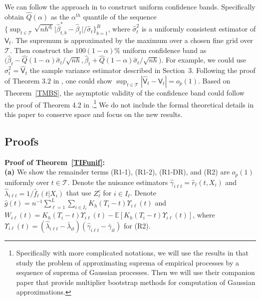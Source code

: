 \documentclass[lettersize, 12pt]{article}
\begin{document}
{We can follow the approach in \cite{Fan} to construct uniform confidence bands.
Specifically obtain $\hat Q(\alpha)$ as the $\alpha^{th}$ quantile of the sequence $\big\{\sup_{t\in\mathcal{T}} \sqrt{nh^{d_t}} \big|\hat\beta^\ast_{t,b} - \hat \beta_t\big|/\hat\sigma_t\big\}_{b=1}^B$, where $\hat\sigma_t^2$ is a uniformly consistent estimator of $\mathsf{V}_t$.
The supremum is approximated by the maximum over a chosen fine grid over $\mathcal{T}$.  
Then construct the $100(1-\alpha)\%$  uniform confidence band as $\big(\hat\beta_t - \hat Q(1-\alpha) \hat\sigma_t/\sqrt{nh}, \hat\beta_t + \hat Q(1-\alpha) \hat\sigma_t/\sqrt{nh} \big)$.
For example, we could use $\hat\sigma_t^2 = \hat{\mathsf{V}}_t$ the sample variance estimator described in Section~3.
Following the proof of Theorem 3.2 in \cite{Fan}, one could show 
$\sup_{t\in\mathcal{T} } |\hat{\mathsf{V}}_t - \mathsf{V}_t| = o_p(1)$.
Based on Theorem~\ref{TMBS}, the asymptotic validity of the confidence band could follow the proof of Theorem 4.2 in \cite{Fan}.\footnote{Specifically with more complicated notations,  
we will use the results in \cite{CCK14b} that study the problem of approximating suprema of empirical processes by a sequence of suprema of Gaussian processes.
Then we will use their companion paper \cite{CCK14a} that provide multiplier bootstrap methods for computation of Gaussian approximations.} 
We do not include the formal theoretical details in this paper to conserve space and focus on the new results.
 


\subsection{Proofs}
\label{Apf}
\textbf{Proof of Theorem~\ref{TIFunif}:}\\[5pt]
\textbf{(a)}
We show the remainder terms (R1-1), (R1-2), (R1-DR), and (R2) are $o_p(1)$ uniformly over $t\in \mathcal{T}$.
Denote the nuisance estimators $\hat \gamma_{i\ell t} = \hat r_\ell(t, X_i)$ and $\hat \lambda_{i\ell t} = 1/\hat f_{\ell}(t|X_i)$ that use $Z_\ell^c$ for $i \in I_\ell$.
Denote $\hat g(t) = n^{-1}\sum_{\ell = 1}^L \sum_{i \in I_\ell} K_h(T_i-t) \Upsilon_{i\ell}(t)$
and $W_{i\ell}(t) = K_h(T_i-t) \Upsilon_{i\ell}(t) - \mathbb{E}\left[K_h(T_i-t) \Upsilon_{i\ell}(t)\right]$, 
where $\Upsilon_{i\ell}(t) = (\hat \lambda_{i\ell t} - \bar\lambda_{it})(\hat \gamma_{i\ell t} - \bar\gamma_{it})$ for (R2). 

}
\end{document}

